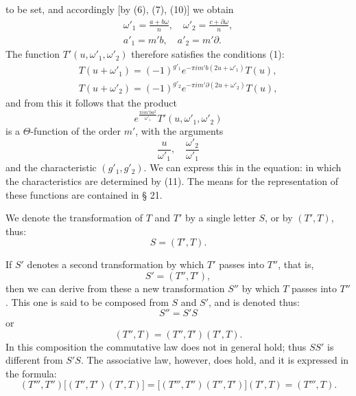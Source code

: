 to be set, and accordingly [by (6), (7), (10)] we obtain
\[
\begin{gathered}
\omega'_1 = \frac{a+b\omega}{n}, \quad \omega'_2 = \frac{c+\partial\omega}{n}, \\
a'_1 = m'b, \quad a'_2 = m'\partial.
\end{gathered}
\]
The function $T'(u, \omega'_1, \omega'_2)$ therefore satisfies the conditions (1):
\[
\begin{gathered}
T(u+\omega'_1) = (-1)^{g'_1} e^{-\pi i m'b(2u+\omega'_1)} T(u), \\
T(u+\omega'_2) = (-1)^{g'_2} e^{-\pi i m'\partial(2u+\omega'_2)} T(u),
\end{gathered}
\]
and from this it follows that the product
\[
e^{\frac{\pi i m'bu^2}{\omega'_1}} T'(u, \omega'_1, \omega'_2)
\]
is a $\Theta$-function of the order $m'$, with the arguments
\[
\frac{u}{\omega'_1}, \quad \frac{\omega'_2}{\omega'_1}
\]
and the characteristic $(g'_1, g'_2)$. We can express this in the
equation:
in which the characteristics are determined by (11). The means for the
representation of these functions are contained in § 21.

We denote the transformation of $T$ and $T'$ by a single
letter $S$, or by $(T', T)$, thus:
\[
S = (T', T).
\]

If $S'$ denotes a second transformation by which $T'$ passes into $T''$,
that is,
\[
S' = (T'', T'),
\]
then we can derive from these a new transformation $S''$ by which
$T$ passes into $T''$. This one is said to be composed from $S$ and $S'$,
and is denoted thus:
\[
S'' = S'S
\]
or
\[
(T'', T) = (T'', T')(T', T).
\]
In this composition the commutative law does not in general
hold; thus $SS'$ is different from $S'S$. The associative law,
however, does hold, and it is expressed in the formula:
\[
(T''', T'')\big[(T'', T')(T', T)\big] = \big[(T''', T'')(T'', T')\big](T', T) = (T''', T).
\]
